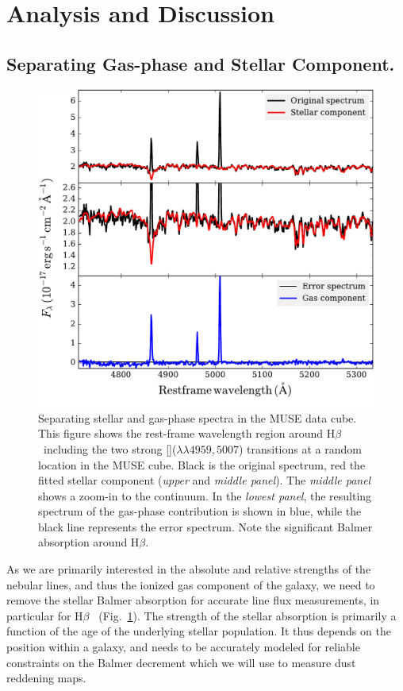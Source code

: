 \documentclass[traditabstract, referee]{aa}
\newcommand{\hb}{H$\beta$}
\newcommand{\oiii}{[\ion{O}{iii}]}
\begin{document}
\section{Analysis and Discussion}

\subsection{Separating Gas-phase and Stellar Component.}
\label{sec:stargas}

\begin{figure}
\includegraphics[angle=0, width=0.99\columnwidth]{Figs/Stargas_spec.pdf}
\caption{Separating stellar and gas-phase spectra in the MUSE data cube. This figure shows the {rest-frame wavelength region around \hb~including the two strong \oiii($\lambda\lambda4959,5007$) transitions at a random location in the MUSE cube. Black is the original spectrum, red the fitted stellar component (\textit{upper} and \textit{middle panel}). The \textit{middle panel} shows a zoom-in to the continuum. In the \textit{lowest panel}, the resulting spectrum of the gas-phase contribution is shown in blue, while the black line represents the error spectrum.} Note the significant Balmer absorption around \hb.}
\label{fig:stargas}
\end{figure}

As we are primarily interested in the absolute and relative strengths of the nebular lines, and thus the ionized gas component of the galaxy, we need to remove the stellar Balmer absorption for accurate line flux measurements, in particular for \hb~ (Fig.~\ref{fig:stargas}). The strength of the stellar absorption is primarily a function of the age of the underlying stellar population. It thus depends on the position within a galaxy, and needs to be accurately modeled for reliable constraints on the Balmer decrement which we will use to measure dust reddening maps.
\end{document}
